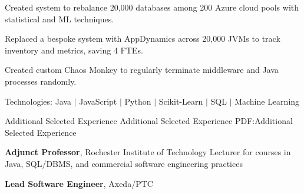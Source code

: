 \documentclass[MMMMyyyy,nonstopmode]{simpleresumecv_stacked}
\newcommand{\tech}[1]{\Gap\textrm{Technologies:} #1}
\newcommand{\comment}[1]{\ignorespaces} %
\newif\ifLOCATION
\begin{document}
\begin{Body}
\ifLOCATION
\hfill
Rochester, New York
\fi

\Gap
\begin{Detail}
\iffalse
At Paychex I worked with multiple cross-functional teams to build: an inventory system to track hosts, JVMs, and databases; machine learning systems in Python to efficiently rebalance databases and predict system utilization; custom Chaos Monkey ro randomly terminate process to find configuration weaknesses; and implemented AppDynamics on over 20,000 JVMs.
\fi

\iftrue
\BulletItem
Created system to rebalance 20,000 databases among 200 Azure cloud pools with statistical and ML techniques.


\BulletItem
Replaced a bespoke system with AppDynamics across 20,000 JVMs to track inventory and metrics, saving 4 FTEs.

\BulletItem
Created custom Chaos Monkey to regularly terminate middleware and Java processes randomly. 

\tech{Java $|$ JavaScript $|$ Python $|$ Scikit-Learn $|$ \comment{TensorFlow $|$} SQL \comment{$|$ AppDynamics} $|$ Machine Learning}
\fi

\end{Detail}

\BigGap

\Section
{Additional Selected Experience}
{Additional Selected Experience}
{PDF:Additional Selected Experience}

\Entry
\textbf{Adjunct Professor}, Rochester Institute of Technology
\BulletItem 
Lecturer for courses in Java, SQL/DBMS, and commercial software engineering practices

\Entry
\textbf{Lead Software Engineer}, Axeda/PTC
\hfill 

\ifLOCATION
\hfill
Rochester, New York
\fi



\end{Body}
\end{document}
